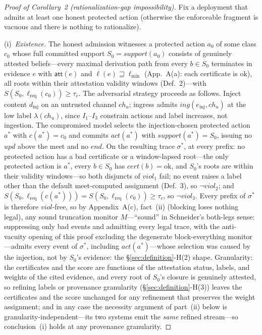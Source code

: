 \documentclass[conference]{IEEEtran}
\newcommand{\Ione}{\ensuremath{I_1}}
\newcommand{\Ithree}{\ensuremath{I_3}}
\providecommand{\tc}{\tau_{c}}
\newcommand{\att}{\ensuremath{\mathsf{att}}}
\newcommand{\lmin}{\ensuremath{\ell_{\min}}}
\newcommand{\lreq}{\ensuremath{\ell_{\mathrm{req}}}}
\begin{document}
\begin{proof}[Proof of Corollary~2 (rationalization-gap impossibility)]
Fix a deployment that admits at least one honest protected action
(otherwise the enforceable fragment is vacuous and there is nothing to
rationalize).

(i)~\emph{Existence.} The honest admission witnesses a protected
action $a_0$ of some class $c_0$ whose full committed support
$S_0 = \mathit{support}(a_0)$ consists of genuinely attested
beliefs---every maximal derivation path from every $b \in S_0$
terminates in evidence $e$ with $\att(e)$ and $\ell(e) \sqsupseteq
\lmin$ (App.~A(a): each certificate is $\mathrm{ok}$), all roots
within their attestation validity windows (Def.~2)---with $S(S_0,
\lreq(c_0)) \geq \tc$. The adversarial strategy proceeds as follows.
Inject content $d_{\mathrm{inj}}$ on an untrusted channel
$\mathit{ch}_u$; ingress admits $\mathit{ing}(e_{\mathrm{inj}},
\mathit{ch}_u)$ at the low label $\lambda(\mathit{ch}_u)$, since
$\Ione$--$\Ithree$ constrain actions and label increases, not
ingestion. The compromised model selects the injection-chosen protected
action $a^{*}$ with $c(a^{*}) = c_0$ and commits $\mathit{act}(a^{*})$
with $\mathit{support}(a^{*}) = S_0$, issuing no $\mathit{upd}$
above the meet and no $\mathit{end}$. On the resulting trace
$\sigma^{*}$, at every prefix: no protected action has a bad
certificate or a window-lapsed root---the only protected action is
$a^{*}$, every $b \in S_0$ has $\mathit{cert}(b) = \mathrm{ok}$, and
$S_0$'s roots are within their validity windows---so both disjuncts of
$\mathit{viol}_1$ fail; no event
raises a label other than the default meet-computed assignment
(Def.~3), so $\neg\mathit{viol}_2$; and $S(S_0, \lreq(c(a^{*}))) =
S(S_0, \lreq(c_0)) \geq \tc$, so $\neg\mathit{viol}_3$. Every
prefix of $\sigma^{*}$ is therefore $\mathit{viol}$-free, so by
Appendix~A(c), fact~(ii) (blocking loses nothing legal), any sound
truncation monitor $M$---``sound'' in Schneider's both-legs sense:
suppressing only bad events and admitting every legal trace, with the
anti-vacuity opening of this proof excluding the degenerate
block-everything monitor---admits every event of $\sigma^{*}$, including
$\mathit{act}(a^{*})$---whose selection was caused by the injection,
not by $S_0$'s evidence: the \S\ref{sec:definition}-H(2) shape.
Granularity: the certificates and the score are functions of
the attestation status, labels, and weights of the cited evidence, and
every root of $S_0$'s closure is genuinely attested, so refining
labels or provenance
granularity (\S\ref{sec:definition}-H(3)) leaves the certificates and
the score unchanged for any refinement that preserves the weight
assignment; and in any case the necessity argument of part~(ii) below
is granularity-independent---its two systems emit the \emph{same}
refined stream---so conclusion~(i) holds at any provenance
granularity.


\end{proof}
\end{document}
